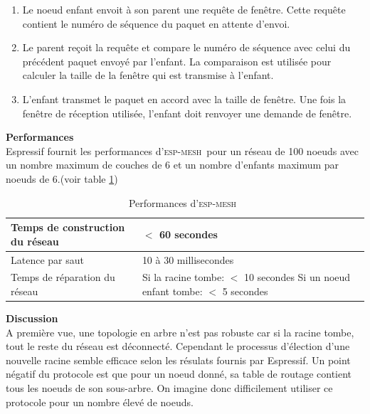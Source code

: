 \documentclass[a4paper, 12pt]{report}
\newcommand{\espmesh}{\textsc{esp-mesh}}
\begin{document}
            \begin{enumerate}
                \item Le noeud enfant envoit à son parent une requête de fenêtre. Cette requête contient le numéro de séquence du paquet en attente d'envoi.
                \item Le parent reçoit la requête et compare le numéro de séquence avec celui du précédent paquet envoyé par l'enfant.
                    La comparaison est utilisée pour calculer la taille de la fenêtre qui est transmise à l'enfant.
                \item L'enfant transmet le paquet en accord avec la taille de fenêtre. Une fois la fenêtre de réception utilisée, l'enfant doit renvoyer une demande de fenêtre.
            \end{enumerate}
        \vspace{0.5cm}
        \textbf{Performances}\\
            Espressif fournit les performances d'\espmesh\ pour un réseau de 100 noeuds avec un nombre maximum de couches de 6 
            et un nombre d'enfants maximum par noeuds de 6.(voir table \ref{performances_espMesh})
            \begin{table}[H]
                \begin{tabular}{|l|l|}
                    \hline
                    Temps de construction du réseau & $<$ 60 secondes\\ \hline
                    Latence par saut & 10 à 30 millisecondes\\ \hline
                    Temps de réparation du réseau & \makecell{Si la racine tombe: $<$ 10 secondes \\ Si un noeud enfant tombe: $<$ 5 secondes}\\ \hline
                \end{tabular}
                \caption{Performances d'\espmesh\ \cite{esp-mesh_w}}
                \label{performances_espMesh}
            \end{table}

            
        \textbf{Discussion}\\
            A première vue, une topologie en arbre n'est pas robuste car si la racine tombe,
            tout le reste du réseau est déconnecté. Cependant le processus d'élection
            d'une nouvelle racine semble efficace selon les résulats fournis par Espressif.
            Un point négatif du protocole est que pour un noeud donné, sa table de routage contient tous les
            noeuds de son sous-arbre.
            On imagine donc difficilement utiliser ce protocole pour un nombre élevé de noeuds.
    
\end{document}
